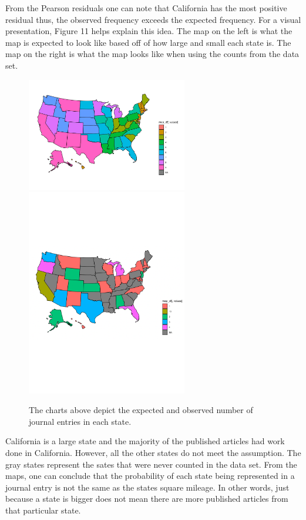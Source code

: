 \documentclass[12pt, letterpaper]{article}
\begin{document}
From the Pearson residuals one can note that California has the most positive residual thus, the observed frequency exceeds the expected frequency. For a visual presentation, Figure 11 helps explain this idea. The map on the left is what the map is expected to look like based off of how large and small each state is. The map on the right is what the map looks like when using the counts from the data set. 
\begin{figure}[!h]
	\includegraphics[width=7cm]{maps.pdf}
	\includegraphics[width=7cm]{observed-map.pdf}
	\label{fig: Expected Frequency based on Square Mileage vs Observed Frequency}
	\caption{The charts above depict the expected and observed number of journal entries in each state.}
\end{figure}

California is a large state and the majority of the published articles had work done in California. However, all the other states do not meet the assumption. The gray states represent the sates that were never counted in the data set. From the maps, one can conclude that the probability of each state being represented in a journal entry is not the same as the states square mileage. In other words, just because a state is bigger does not mean there are more published articles from that particular state.
\end{document}
